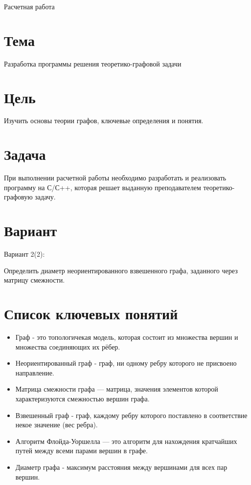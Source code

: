 \documentclass[12pt]{article}
\begin{document}
\begin{center} 
   \Large Расчетная работа
   \end{center} 

\section{Тема}

Разработка программы решения теоретико-графовой задачи

\section{Цель}

Изучить основы теории графов, ключевые определения и понятия.

\section{Задача}

При выполнении расчетной работы необходимо разработать и реализовать программу на С/С++, которая решает выданную преподавателем теоретико-графовую задачу.

\section{Вариант}

Вариант 2(2):

Определить диаметр неориентированного взвешенного графа, заданного через матрицу смежности.

\section{Список ключевых понятий}

\begin{itemize}
\item Граф - это топологичекая модель, которая состоит из множества вершин и множества соединяющих их рёбер.
\item Неориентированный граф - граф, ни одному ребру которого не присвоено направление.
\item Матрица смежности графа — матрица, значения элементов которой характеризуются смежностью вершин графа. 
\item Взвешенный граф - граф, каждому ребру которого поставлено в соответствие некое значение (вес ребра).
\item Алгоритм Флойда-Уоршелла — это алгоритм для нахождения кратчайших путей между всеми парами вершин в графе.
\item Диаметр графа - максимум расстояния между вершинами для всех пар вершин.
\end{itemize}
\end{document}
